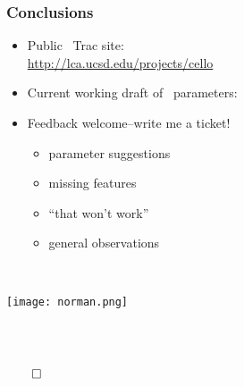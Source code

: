 \begin{frame}[fragile] 
   \frametitle{Conclusions}




\begin{itemize}
\item Public \cello\ Trac site: \\ \textcolor{blue}{\url{http://lca.ucsd.edu/projects/cello}}
\item Current working draft of \enzop\ parameters:
{\footnotesize{}}
\end{itemize}
\begin{minipage}{2.6in}
\begin{itemize}
\item Feedback welcome--write me a ticket!
\begin{itemize}
\item parameter suggestions
\item missing features
\item ``that won't work''
\item general observations
\end{itemize}
\end{itemize}
\end{minipage} \
\begin{minipage}{1.2in}
   \centerline{\texttt{[image: norman.png]}}
\end{minipage}
\ \\
\ \\
\centerline{$\qed$}
\end{frame}


